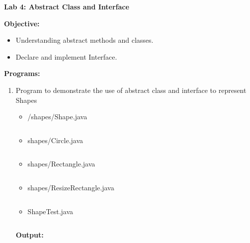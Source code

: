 \documentclass{book}
\begin{document}
{\Huge \textbf{Lab 4: Abstract Class and Interface}}
\\
\par
{
    \large
    \textbf{Objective:}
    \begin{itemize}
        \item{Understanding abstract methods and classes.}
        \item{Declare and implement Interface.}
    \end{itemize}
    \par
    \textbf{Programs:}
    \begin{enumerate}
        \item{Program to demonstrate the use of abstract class and interface to represent Shapes}
            \par
            \begin{itemize}
                \item{/shapes/Shape.java}
                \inputminted{java}{shapes/Shape.java}
                \item{shapes/Circle.java}
                \inputminted{java}{shapes/Circle.java}
                \item{shapes/Rectangle.java}
                \inputminted{java}{shapes/Rectangle.java}
                \item{shapes/ResizeRectangle.java}
                \inputminted{java}{shapes/ResizeRectangle.java}
                \item{ShapeTest.java}
                \inputminted{java}{ShapeTest.java}
            \end{itemize}
            \par
            \textbf{Output:}

\end{enumerate}}
\end{document}

